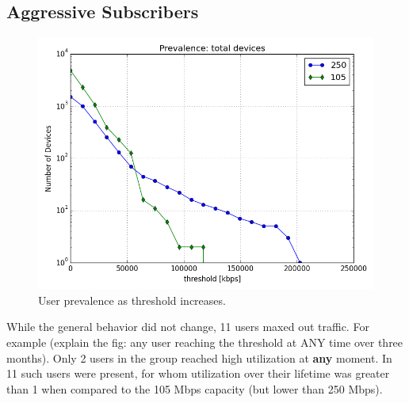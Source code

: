 \subsection{Aggressive Subscribers}\label{subsec:prevalence}

\begin{figure}[ht]
\begin{minipage}{1\linewidth}
\centering
\includegraphics[width=0.9\linewidth]{figures/prevalence.png}
\caption{User prevalence as threshold increases.}
\label{fig:prevalence}
\end{minipage}
\end{figure}

While the general behavior did not change, 11 users maxed out traffic.
For example (explain the fig: any user reaching the threshold at ANY time 
over three months). Only 2 users in the \control{} group reached high 
utilization at \textbf{any} moment. In \treatment{} 11 such users were present, 
for whom utilization over their lifetime was greater than 1 when compared to 
the 105 Mbps capacity (but lower than 250 Mbps).